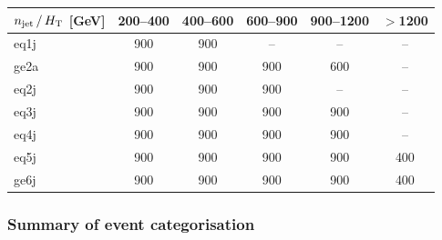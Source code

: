 \begin{table}[!h]
  \label{tab:mht-binning}
  \centering
  \begin{tabular}{ lccccc }
    \hline
    $n_{\text{jet}}\, / \,\mbox{$H_\text{T}$}$ [GeV] & 200--400 & 400--600 & 600--900 & 900--1200 & $>$1200 \\
    \hline
    eq1j                        & 900      & 900      & --       & --        & --      \\ 
    ge2a                        & 900      & 900      & 900      & 600       & --      \\ 
    eq2j                        & 900      & 900      & 900      & --        & --      \\ 
    eq3j                        & 900      & 900      & 900      & 900       & --      \\ 
    eq4j                        & 900      & 900      & 900      & 900       & --      \\ 
    eq5j                        & 900      & 900      & 900      & 900       & 400     \\ 
    ge6j                        & 900      & 900      & 900      & 900       & 400     \\ 
    \hline
  \end{tabular}
\end{table}

\subsubsection{Summary of event categorisation}
\label{sec:binning-summary}


